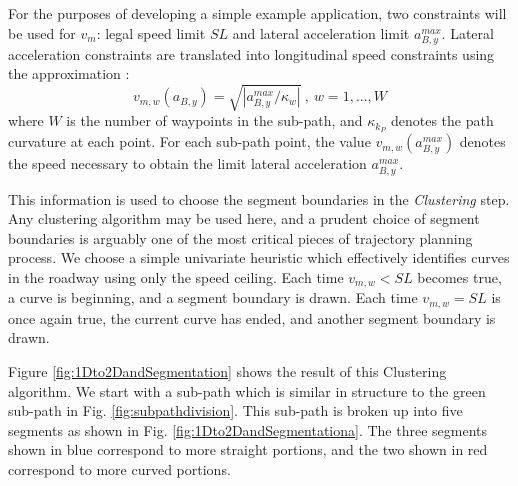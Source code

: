 \documentclass[letterpaper, 10 pt, conference]{ieeeconf}  %
\begin{document}
For the purposes of developing a simple example application, two constraints will be used for $v_{m}$: legal speed limit $SL$ and lateral acceleration limit $a_{B,y}^{max}$. 
Lateral acceleration constraints are translated into longitudinal speed constraints using the approximation :
\begin{equation}
  v_{m,w}(a_{B,y}) = \sqrt{ | a_{B,y}^{max} / \kappa_{w} | } ~,~ w = 1, ..., W
\end{equation}
where $W$ is the number of waypoints in the sub-path, and $\kappa_{k_P}$ denotes the path curvature at each point.
For each sub-path point, the value $v_{m,w}(a_{B,y}^{max})$ denotes the speed necessary to obtain the limit lateral acceleration $a^{max}_{B,y}$.

This information is used to choose the segment boundaries in the {\it Clustering} step.
Any clustering algorithm may be used here, and a prudent choice of segment boundaries is arguably one of the most critical pieces of trajectory planning process.
We choose a simple univariate heuristic which effectively identifies curves in the roadway using only the speed ceiling.
Each time $v_{m,w} < SL$ becomes true, a curve is beginning, and a segment boundary is drawn.
Each time $v_{m,w} = SL$ is once again true, the current curve has ended, and another segment boundary is drawn.

Figure \ref{fig:1Dto2DandSegmentation} shows the result of this Clustering algorithm. 
We start with a sub-path which is similar in structure to the green sub-path in Fig. \ref{fig:subpathdivision}.
This sub-path is broken up into five segments as shown in Fig. \ref{fig:1Dto2DandSegmentationa}.
The three segments shown in blue correspond to more straight portions, and the two shown in red correspond to more curved portions.
 
\end{document}
